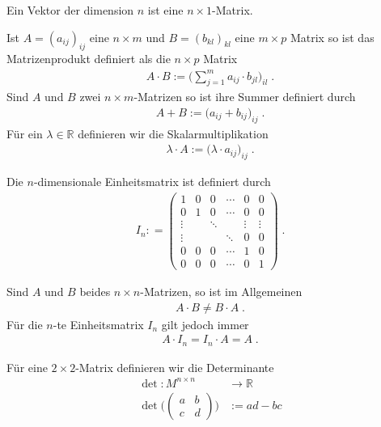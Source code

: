 \begin{Bemerkung}
Ein Vektor der dimension $n$ ist eine $n \times 1$-Matrix.
\end{Bemerkung}
\begin{Definition}
Ist $A = (a_{ij})_{ij}$ eine $n \times m$ und $B = (b_{kl})_{kl}$ eine $m \times p$ Matrix so
ist das Matrizenprodukt definiert als die $n \times p$ Matrix
\begin{align*}
A \cdot B := \Biggl( \sum_{j=1}^{m}a_{ij} \cdot b_{jl} \Biggr)_{il} \; .
\end{align*}
Sind $A$ und $B$  zwei $n \times m$-Matrizen so ist ihre Summer definiert durch 
\begin{align*}
A + B := \biggl( a_{ij} + b_{ij} \biggr)_{ij} \;.
\end{align*}
Für ein $\lambda \in \mathbb{R}$ definieren wir die Skalarmultiplikation
\begin{align*}
\lambda \cdot A := \biggl( \lambda \cdot a_{ij} \biggr)_{ij} \;.
\end{align*}
\end{Definition}


\begin{Definition}
Die $n$-dimensionale Einheitsmatrix ist definiert durch
\begin{align*}
I_n : = \begin{pmatrix}
1 & 0 & 0 & \cdots & 0 & 0 \\
0 & 1 & 0 & \cdots & 0 & 0 \\
\vdots &  & \ddots &  & \vdots & \vdots \\
\vdots &  &  &  \ddots & 0 & 0 \\
0 & 0 & 0 & \cdots & 1 & 0 \\
0 & 0 & 0 & \cdots & 0 & 1
\end{pmatrix} \; .
\end{align*}
\end{Definition}

\begin{Bemerkung}
Sind $A$ und $B$ beides $n\times n$-Matrizen, so ist im Allgemeinen
\begin{align*}
A \cdot B \neq B \cdot A \; .
\end{align*}
Für die $n$-te Einheitsmatrix $I_n$ gilt jedoch immer
\begin{align*}
A \cdot I_n =  I_n \cdot A  = A \; .
\end{align*}
\end{Bemerkung}


\begin{Definition}
Für eine $2 \times 2$-Matrix definieren wir die Determinante
\begin{align*}
\det : M^{n \times n}  & \to \mathbb{R} \\
\det \biggl ( 
\begin{pmatrix}
a & b \\ c & d
\end{pmatrix}
 \biggr)  & := ad - bc
\end{align*}
\end{Definition}


